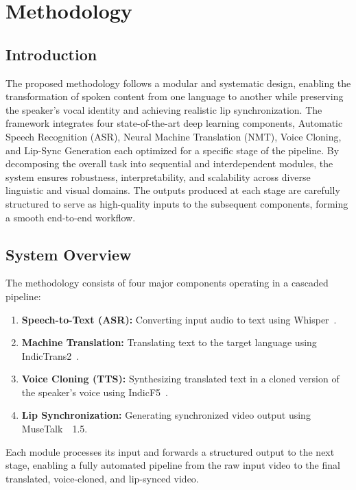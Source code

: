 \documentclass[12pt,oneside]{report}
\begin{document}
\chapter{Methodology}
\label{ch:method}

\section{Introduction}

The proposed methodology follows a modular and systematic design, enabling the transformation of spoken content from one language to another while preserving the speaker’s vocal identity and achieving realistic lip synchronization. The framework integrates four state-of-the-art deep learning components, Automatic Speech Recognition (ASR), Neural Machine Translation (NMT), Voice Cloning, and Lip-Sync Generation each optimized for a specific stage of the pipeline. By decomposing the overall task into sequential and interdependent modules, the system ensures robustness, interpretability, and scalability across diverse linguistic and visual domains. The outputs produced at each stage are carefully structured to serve as high-quality inputs to the subsequent components, forming a smooth end-to-end workflow.

\section{System Overview}

The methodology consists of four major components operating in a cascaded pipeline:

\begin{enumerate}
    \item \textbf{Speech-to-Text (ASR):} Converting input audio to text using Whisper~\cite{radford2023whisper}.
    \item \textbf{Machine Translation:} Translating text to the target language using IndicTrans2~\cite{gala2023indictrans2}.
    \item \textbf{Voice Cloning (TTS):} Synthesizing translated text in a cloned version of the speaker’s voice using IndicF5~\cite{indicf5_2025}.
    \item \textbf{Lip Synchronization:} Generating synchronized video output using MuseTalk~\cite{zhang2023musetalk}~1.5.
\end{enumerate}

Each module processes its input and forwards a structured output to the next stage, enabling a fully automated pipeline from the raw input video to the final translated, voice-cloned, and lip-synced video.
\end{document}
